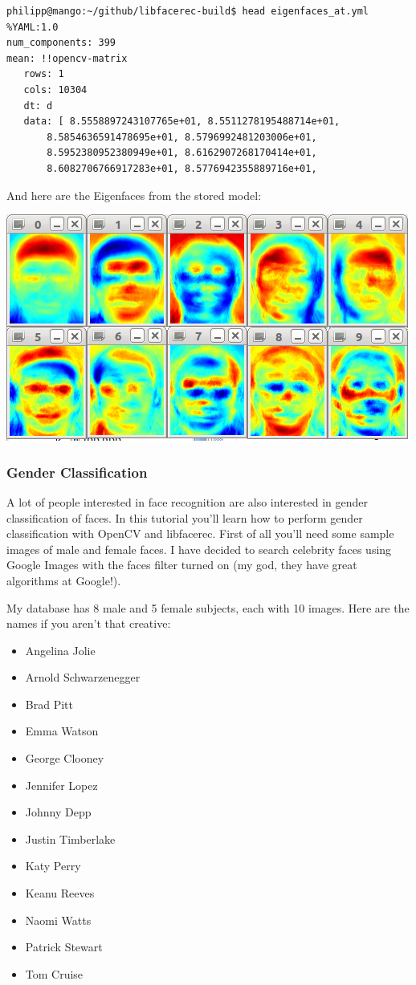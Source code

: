 \begin{lstlisting}
philipp@mango:~/github/libfacerec-build$ head eigenfaces_at.yml
%YAML:1.0
num_components: 399
mean: !!opencv-matrix
   rows: 1
   cols: 10304
   dt: d
   data: [ 8.5558897243107765e+01, 8.5511278195488714e+01,
       8.5854636591478695e+01, 8.5796992481203006e+01,
       8.5952380952380949e+01, 8.6162907268170414e+01,
       8.6082706766917283e+01, 8.5776942355889716e+01,
\end{lstlisting}

And here are the Eigenfaces from the stored model:

\begin{center}
	\includegraphics[scale=0.60]{img/libfacerec/stored_loaded_eigenfaces_at.png}
\end{center}

\subsubsection{Gender Classification}

A lot of people interested in face recognition are also interested in gender classification of faces. In this tutorial you’ll learn how to perform gender classification with OpenCV and libfacerec. First of all you’ll need some sample images of male and female faces. I have decided to search celebrity faces using Google Images with the faces filter turned on (my god, they have great algorithms at Google!).

My database has 8 male and 5 female subjects, each with 10 images. Here are the names if you aren’t that creative:

\begin{itemize}
 \item Angelina Jolie
 \item Arnold Schwarzenegger
 \item Brad Pitt
 \item Emma Watson
 \item George Clooney
 \item Jennifer Lopez
 \item Johnny Depp
 \item Justin Timberlake
 \item Katy Perry
 \item Keanu Reeves
 \item Naomi Watts
 \item Patrick Stewart
 \item Tom Cruise
\end{itemize}

